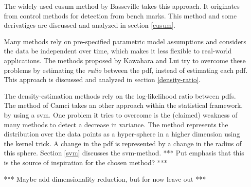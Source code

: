 The widely used \gls{cusum} method by Basseville \etal \cite{basseville1993detection} takes this approach.
It originates from control methods for detection from bench marks.
This method and some derivatiges are discussed and analyzed in section \ref{cusum}.

Many methods rely on pre-specified parametric model assumptions and considers the data be independent over time, which makes it less flexible to real-world applications.
The methods proposed by Kawahara \etal \cite{kawahara2009change} and Lui \etal \cite{liu2013change} try to overcome these problems by estimating the \emph{ratio} between the \gls{pdf}, instead of estimating each \gls{pdf}.
This approach is discussed and analyzed in section \ref{density-ratio}.

The density-estimation methods rely on the log-likelihood ratio between \glspl{pdf}.
The method of Camci \cite{camci2010change} takes an other approach within the statistical framework, by using a \gls{svm}.
One problem it tries to overcome is the (claimed) weakness of many methods to detect a decrease in variance.
The method represents the distribution over the data points as a hyper-sphere in a higher dimension using the kernel trick.
A change in the \gls{pdf} is represented by a change in the radius of this sphere.
Section \ref{svm} discusses the \gls{svm}-method.
*** Put emphasis that this is the source of inspiration for the chosen method? ***


*** Maybe add dimensionality reduction, but for now leave out ***











% 
